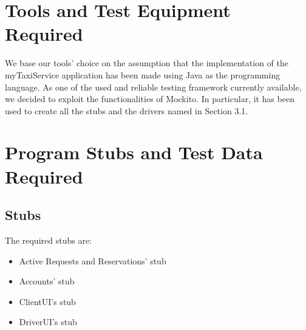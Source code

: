 \documentclass{article}
\begin{document}
\section{Tools and Test Equipment Required}
We base our tools' choice on the assumption that
the implementation of the myTaxiService application
has been made using Java as the programming language.
As one of the used and reliable testing framework
currently available, we decided to exploit the
functionalities of Mockito. In particular, it
has been used to create all the stubs and the drivers
named in Section 3.1.
\section{Program Stubs and Test Data Required}
\subsection{Stubs}
The required stubs are:
\begin{itemize}
	\item Active Requests and Reservations' stub
	\item Accounts' stub
	\item ClientUI's stub
	\item DriverUI's stub
\end{itemize}
\end{document}
